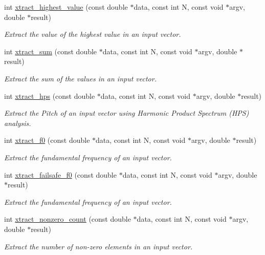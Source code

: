 \begin{DoxyCompactItemize}
int \hyperlink{group__scalar_ga3ebf750817f15e8a2ed40a662e93c14c}{xtract\-\_\-highest\-\_\-value} (const double $\ast$data, const int N, const void $\ast$argv, double $\ast$result)
\begin{DoxyCompactList}\small\item\em Extract the value of the highest value in an input vector. \end{DoxyCompactList}\item 
int \hyperlink{group__scalar_ga9ef81b1887ec2ab01a3574eaa2c64c06}{xtract\-\_\-sum} (const double $\ast$data, const int N, const void $\ast$argv, double $\ast$result)
\begin{DoxyCompactList}\small\item\em Extract the sum of the values in an input vector. \end{DoxyCompactList}\item 
int \hyperlink{group__scalar_ga00f0a8145e2960111bba8541b615cf64}{xtract\-\_\-hps} (const double $\ast$data, const int N, const void $\ast$argv, double $\ast$result)
\begin{DoxyCompactList}\small\item\em Extract the Pitch of an input vector using Harmonic Product Spectrum (H\-P\-S) analysis. \end{DoxyCompactList}\item 
int \hyperlink{group__scalar_ga62d2fbad7e52bd4a5a6c0d0fd6d69e94}{xtract\-\_\-f0} (const double $\ast$data, const int N, const void $\ast$argv, double $\ast$result)
\begin{DoxyCompactList}\small\item\em Extract the fundamental frequency of an input vector. \end{DoxyCompactList}\item 
int \hyperlink{group__scalar_ga446b5d84c16905514480308f02205025}{xtract\-\_\-failsafe\-\_\-f0} (const double $\ast$data, const int N, const void $\ast$argv, double $\ast$result)
\begin{DoxyCompactList}\small\item\em Extract the fundamental frequency of an input vector. \end{DoxyCompactList}\item 
int \hyperlink{group__scalar_ga86f6b7e5ff65d30b5f92a257cf7a2b19}{xtract\-\_\-nonzero\-\_\-count} (const double $\ast$data, const int N, const void $\ast$argv, double $\ast$result)
\begin{DoxyCompactList}\small\item\em Extract the number of non-\/zero elements in an input vector. \end{DoxyCompactList}\end{DoxyCompactItemize}


